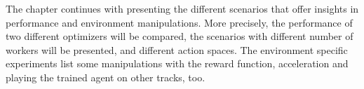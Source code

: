 The chapter continues with presenting the different scenarios that offer insights in performance and environment manipulations. More precisely, the performance of two different optimizers will be compared, the scenarios with different number of workers will be presented, and different action spaces. The environment specific experiments list some manipulations with the reward function, acceleration and playing the trained agent on other tracks, too.






